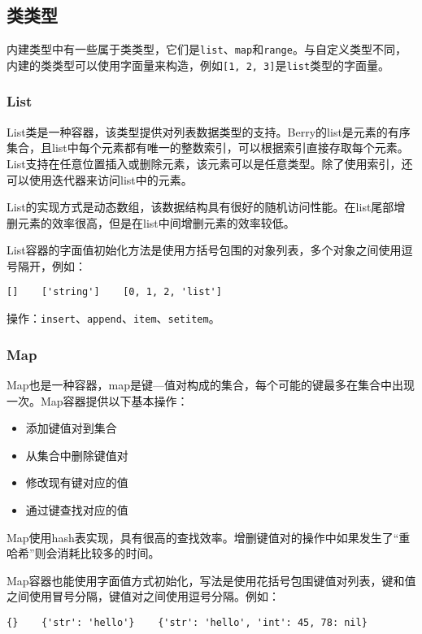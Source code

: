 \subsection{类类型}

内建类型中有一些属于类类型，它们是\texttt{list}、\texttt{map}和\texttt{range}。与自定义类型不同，内建的类类型可以使用字面量来构造，例如\texttt{[1, 2, 3]}是\texttt{list}类型的字面量。

\subsubsection{List}

List类是一种容器，该类型提供对列表数据类型的支持。Berry的list是元素的有序集合，且list中每个元素都有唯一的整数索引，可以根据索引直接存取每个元素。List支持在任意位置插入或删除元素，该元素可以是任意类型。除了使用索引，还可以使用迭代器来访问list中的元素。

List的实现方式是动态数组，该数据结构具有很好的随机访问性能。在list尾部增删元素的效率很高，但是在list中间增删元素的效率较低。

List容器的字面值初始化方法是使用方括号包围的对象列表，多个对象之间使用逗号隔开，例如：
\begin{lstlisting}[language=berry, numbers=none]
[]    ['string']    [0, 1, 2, 'list']
\end{lstlisting}

操作：\texttt{insert}、\texttt{append}、\texttt{item}、\texttt{setitem}。

\subsubsection{Map}

Map也是一种容器，map是键—值对构成的集合，每个可能的键最多在集合中出现一次。Map容器提供以下基本操作：
\begin{itemize}
    \item 添加键值对到集合
    \item 从集合中删除键值对
    \item 修改现有键对应的值
    \item 通过键查找对应的值
\end{itemize}

Map使用hash表实现，具有很高的查找效率。增删键值对的操作中如果发生了``重哈希''则会消耗比较多的时间。

Map容器也能使用字面值方式初始化，写法是使用花括号包围键值对列表，键和值之间使用冒号分隔，键值对之间使用逗号分隔。例如：
\begin{lstlisting}[language=berry, numbers=none]
{}    {'str': 'hello'}    {'str': 'hello', 'int': 45, 78: nil}
\end{lstlisting}

